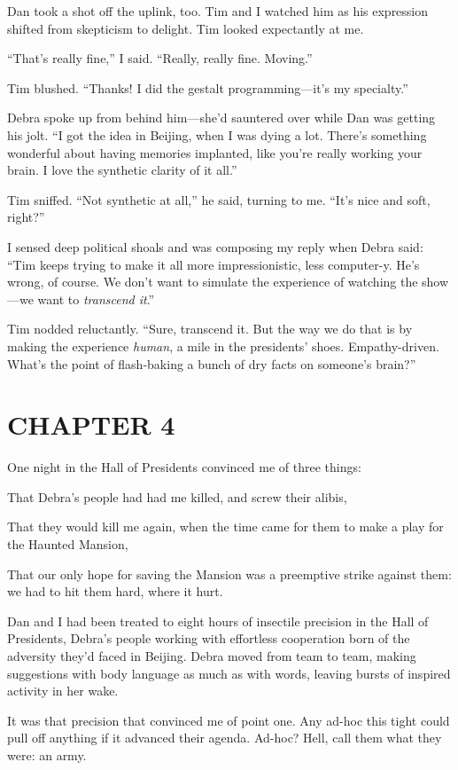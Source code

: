 Dan took a shot off the uplink, too. Tim and I watched him as his
expression shifted from skepticism to delight. Tim looked
expectantly at me.

“That's really fine,” I said. “Really, really fine. Moving.”

Tim blushed. “Thanks! I did the gestalt programming—it's my
specialty.”

Debra spoke up from behind him—she'd sauntered over while Dan was
getting his jolt. “I got the idea in Beijing, when I was dying a
lot. There's something wonderful about having memories implanted,
like you're really working your brain. I love the synthetic clarity
of it all.”

Tim sniffed. “Not synthetic at all,” he said, turning to me. “It's
nice and soft, right?”

I sensed deep political shoals and was composing my reply when
Debra said: “Tim keeps trying to make it all more impressionistic,
less computer-y. He's wrong, of course. We don't want to simulate
the experience of watching the show—we want to
\emph{transcend it}.”

Tim nodded reluctantly. “Sure, transcend it. But the way we do that
is by making the experience \emph{human}, a mile in the presidents'
shoes. Empathy-driven. What's the point of flash-baking a bunch of
dry facts on someone's brain?”

\section{CHAPTER 4}

One night in the Hall of Presidents convinced me of three things:

That Debra's people had had me killed, and screw their alibis,

That they would kill me again, when the time came for them to make
a play for the Haunted Mansion,

That our only hope for saving the Mansion was a preemptive strike
against them: we had to hit them hard, where it hurt.

Dan and I had been treated to eight hours of insectile precision in
the Hall of Presidents, Debra's people working with effortless
cooperation born of the adversity they'd faced in Beijing. Debra
moved from team to team, making suggestions with body language as
much as with words, leaving bursts of inspired activity in her
wake.

It was that precision that convinced me of point one. Any ad-hoc
this tight could pull off anything if it advanced their agenda.
Ad-hoc? Hell, call them what they were: an army.


